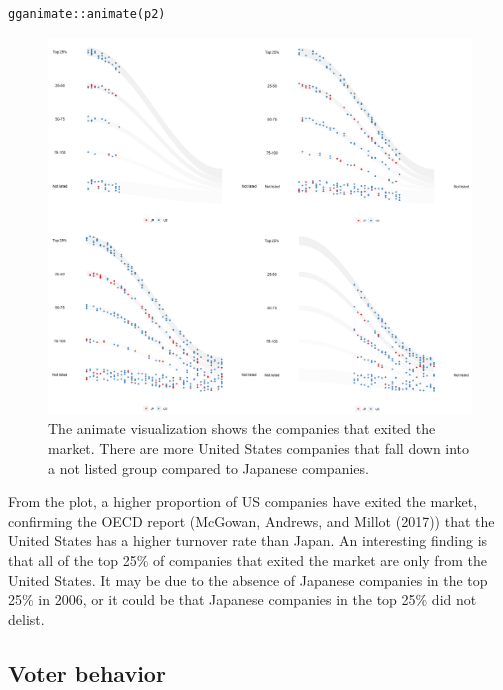 \begin{verbatim}
gganimate::animate(p2)
\end{verbatim}

\begin{figure}

{\centering \includegraphics[width=1\linewidth]{figures/animation-exit} 

}

\caption{The animate visualization shows the companies that exited the market. There are more United States companies that fall down into a not listed group compared to Japanese companies.}\label{fig:osiris-figure}
\end{figure}

From the plot, a higher proportion of US companies have exited the market, confirming the OECD report (McGowan, Andrews, and Millot (2017)) that the United States has a higher turnover rate than Japan. An interesting finding is that all of the top 25\% of companies that exited the market are only from the United States. It may be due to the absence of Japanese companies in the top 25\% in 2006, or it could be that Japanese companies in the top 25\% did not delist.

\hypertarget{voter-behavior}{%
\subsection{Voter behavior}\label{voter-behavior}}

